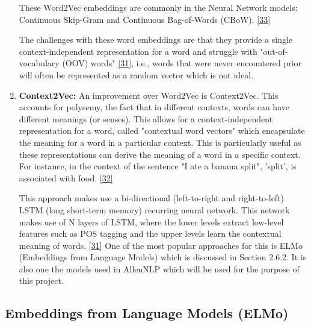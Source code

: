 \begin{enumerate}
These Word2Vec embeddings are commonly in the Neural Network models: Continuous Skip-Gram and Continuous Bag-of-Words (CBoW). \hyperlink{33}{[33]} 

The challenges with these word embeddings are that they provide a single context-independent representation for a word and struggle with "out-of-vocabulary (OOV) words" \hyperlink{31}{[31]}, i.e., words that were never encountered prior will often be represented as a random vector which is not ideal.

\item \textbf{Context2Vec:} An improvement over Word2Vec is Context2Vec. This accounts for polysemy, the fact that in different contexts, words can have different meanings (or senses). This allows for a context-independent representation for a word, called
"contextual word vectors" which encapsulate the meaning for a word in a particular context. This is particularly useful as these representations can derive the meaning of a word in a specific context. For instance, in the context of the sentence "I ate a banana split", 'split', is associated with food. \hyperlink{32}{[32]} 

This approach makes use a bi-directional (left-to-right and right-to-left) LSTM (long short-term memory) recurring neural network. This network makes use of N layers of LSTM, where the lower levels extract low-level features such as POS tagging and the upper levels learn the contextual meaning of words. \hyperlink{31}{[31]} One of the most popular approaches for this is ELMo (Embeddings from Language Models) which is discussed in Section 2.6.2. It is also one the models used in AllenNLP which will be used for the purpose of this project. 
\end{enumerate}

\subsection{Embeddings from Language Models (ELMo)} \label{elmo}
\vspace{-4ex}

